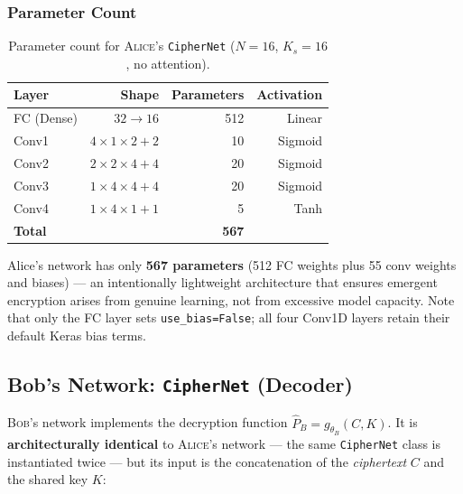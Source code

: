 \documentclass[12pt, a4paper]{article}
\newcommand{\alice}{\textsc{Alice}}
\newcommand{\bob}{\textsc{Bob}}
\newcommand{\thetaB}{\theta_{\!B}}
\newcommand{\code}[1]{\texttt{\color{CodeRed}#1}}
\begin{document}
\subsubsection*{Parameter Count}

\begin{table}[H]
  \centering
  \caption{Parameter count for \alice{}'s \code{CipherNet}
           ($N=16$, $K_s=16$, no attention).}
  \label{tab:alice_params}
  \renewcommand{\arraystretch}{1.25}
  \begin{tabular}{@{} l r r r @{}}
    \toprule
    \textbf{Layer} & \textbf{Shape} & \textbf{Parameters} & \textbf{Activation} \\
    \midrule
    FC (Dense)  & $32 \to 16$             & 512 & Linear  \\
    Conv1       & $4\!\times\!1\!\times\!2 + 2$ & 10 & Sigmoid \\
    Conv2       & $2\!\times\!2\!\times\!4 + 4$ & 20 & Sigmoid \\
    Conv3       & $1\!\times\!4\!\times\!4 + 4$ & 20 & Sigmoid \\
    Conv4       & $1\!\times\!4\!\times\!1 + 1$ & 5  & Tanh    \\
    \midrule
    \textbf{Total} & & \textbf{567} & \\
    \bottomrule
  \end{tabular}
\end{table}

Alice's network has only \textbf{567 parameters} (512 FC weights plus
55 conv weights and biases) --- an intentionally lightweight architecture
that ensures emergent encryption arises from genuine learning, not from
excessive model capacity. Note that only the FC layer sets
\code{use\_bias=False}; all four Conv1D layers retain their default
Keras bias terms.

\subsection{Bob's Network: \texttt{CipherNet} (Decoder)}
\label{subsec:bob_net}

\bob{}'s network implements the decryption function
$\hat{P}_B = g_{\thetaB}(C, K)$. It is \textbf{architecturally identical}
to \alice{}'s network --- the same \code{CipherNet} class is instantiated
twice --- but its input is the concatenation of the \emph{ciphertext} $C$
and the shared key $K$:
\end{document}
